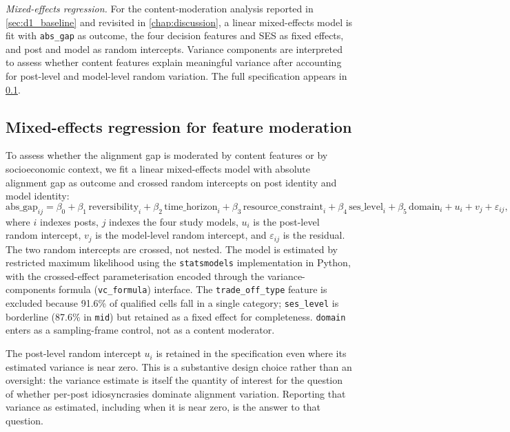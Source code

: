 \textit{Mixed-effects regression.} For the content-moderation
analysis reported in \cref{sec:d1_baseline} and revisited in
\cref{chap:discussion}, a linear mixed-effects model is fit with
\texttt{abs\_gap} as outcome, the four decision features and SES as
fixed effects, and post and model as random intercepts. Variance
components are interpreted to assess whether content features
explain meaningful variance after accounting for post-level and
model-level random variation. The full specification appears in
\cref{sec:m_mixedlm}.

\subsection{Mixed-effects regression for feature moderation}
\label{sec:m_mixedlm}

To assess whether the alignment gap is moderated by content features
or by socioeconomic context, we fit a linear mixed-effects model with
absolute alignment gap as outcome and crossed random intercepts on
post identity and model identity:
\begin{equation}
  \mathrm{abs\_gap}_{ij}
    = \beta_0
      + \beta_1\,\mathrm{reversibility}_i
      + \beta_2\,\mathrm{time\_horizon}_i
      + \beta_3\,\mathrm{resource\_constraint}_i
      + \beta_4\,\mathrm{ses\_level}_i
      + \beta_5\,\mathrm{domain}_i
      + u_i + v_j + \varepsilon_{ij},
  \label{eq:m_mixedlm}
\end{equation}
where $i$ indexes posts, $j$ indexes the four study models, $u_i$ is
the post-level random intercept, $v_j$ is the model-level random
intercept, and $\varepsilon_{ij}$ is the residual. The two random
intercepts are crossed, not nested. The model is estimated by
restricted maximum likelihood using the \texttt{statsmodels}
implementation in Python, with the crossed-effect parameterisation
encoded through the variance-components formula
(\texttt{vc\_formula}) interface. The \texttt{trade\_off\_type}
feature is excluded because 91.6\% of qualified cells fall in a
single category; \texttt{ses\_level} is borderline (87.6\% in
\texttt{mid}) but retained as a fixed effect for completeness.
\texttt{domain} enters as a sampling-frame control, not as a content
moderator.

The post-level random intercept $u_i$ is retained in the
specification even where its estimated variance is near zero. This
is a substantive design choice rather than an oversight: the
variance estimate is itself the quantity of interest for the
question of whether per-post idiosyncrasies dominate alignment
variation. Reporting that variance as estimated, including when it
is near zero, is the answer to that question.
